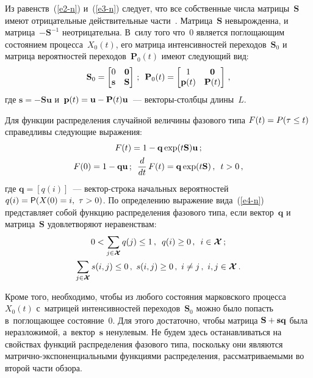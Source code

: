 {\begin{multicols}{2}
  Из равенств~(\ref{e2-n}) и~(\ref{e3-n}) следует, что все собственные числа 
матрицы~$\mathbf{S}$ имеют отрицательные действительные  
части~\cite{21-n}. Матрица~$\mathbf{S}$ невырожденна, и матрица~$-
\mathbf{S}^{-1}$ неотрицательна. В~силу того что~0 является поглощающим 
состоянием процесса~$X_0(t)$, его матрица интенсивностей 
переходов~$\mathbf{S}_0$ и матрица вероятностей 
переходов~$\mathbf{P}_0(t)$ имеют следующий вид:
  $$
  \mathbf{S}_0=\begin{bmatrix}
  0&\mathbf{0}\\
  \mathbf{s} &\mathbf{S}
  \end{bmatrix}\,;\enskip
  \mathbf{P}_0(t)=\begin{bmatrix}
  1 &\mathbf{0}\\
  \mathbf{p}(t)& \mathbf{P}(t)
  \end{bmatrix}\,,
  $$
где $\mathbf{s}=-\mathbf{S}\mathbf{u}$ и~$\mathbf{p}(t)\hm= \mathbf{u}\hm- 
\mathbf{P}(t) \mathbf{u}$~---  век\-то\-ры-столб\-цы длины~$L$. 
    
Для функции распределения случайной величины фазового типа $F(t)\hm= 
P(\tau\leq t)$ справедливы следующие выражения:
\begin{gather}
F(t)=1-\mathbf{q}\exp (t\mathbf{S})\mathbf{u}\,;\label{e4-n}\\
F(0)=1-\mathbf{q}\mathbf{u}\,;\enskip
  \displaystyle\frac{\displaystyle d\mathstrut}{\displaystyle dt\mathstrut}\,F(t)= \mathbf{q}\exp (t\mathbf{S})\,,\enskip 
t>0\,,\notag
\end{gather}
где $\mathbf{q}=[q(i)]$~--- век\-тор-стро\-ка начальных вероятностей $q(i)\hm= 
{\sf P}(X(0)=i,\ \tau>0)$. По определению выражение вида~(\ref{e4-n}) 
представляет собой функцию распределения фазового типа, если 
вектор~$\mathbf{q}$  и мат\-ри\-ца~$\mathbf{S}$ удовлетворяют неравенствам: 
\begin{gather*}
\displaystyle 0<\sum\limits_{j\in\boldsymbol{\mathcal{X}}} q(j)\leq 1\,,\enskip 
q(i)\geq0\,,\enskip i\in \boldsymbol{\mathcal{X}}\,;\\
\displaystyle 
\sum\limits_{j\in\boldsymbol{\mathcal{X}}} s(i,j)\leq0\,,\ s(i,j)\geq 0\,,\ i\not= j\,,\ 
i,j\in \boldsymbol{\mathcal{X}}\,.
\end{gather*} 
  
  Кроме того, необходимо, чтобы из любого состояния марковского процесса 
$X_0(t)$ с~мат\-ри\-цей интенсивностей переходов~$\mathbf{S}_0$ можно было 
попасть в~поглощающее состояние~0. Для этого достаточно, чтобы матрица 
$\mathbf{S}\hm+ \mathbf{s}\mathbf{q}$ была неразложимой, 
а~вектор~$\mathbf{s}$ ненулевым. Не будем здесь останавливаться на 
свойствах функций распределения фазового типа, поскольку они являются 
мат\-рич\-но-экс\-по\-нен\-ци\-аль\-ны\-ми функциями распределения, 
рассматриваемыми во второй части обзора. 


\end{multicols}}
